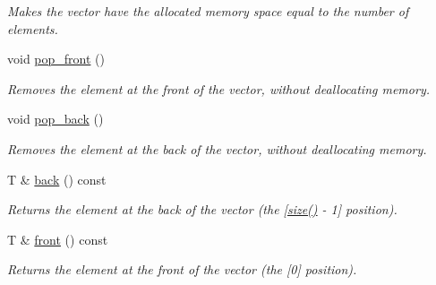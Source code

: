 \begin{DoxyCompactItemize}
\begin{DoxyCompactList}\small\item\em Makes the vector have the allocated memory space equal to the number of elements. \end{DoxyCompactList}\item 
\mbox{\label{classsc_1_1Vector_a51b1b215ab5bfb9b6fdfc7104838efec}} 
void \hyperlink{classsc_1_1Vector_a51b1b215ab5bfb9b6fdfc7104838efec}{pop\+\_\+front} ()
\begin{DoxyCompactList}\small\item\em Removes the element at the front of the vector, without deallocating memory. \end{DoxyCompactList}\item 
\mbox{\label{classsc_1_1Vector_ab95364b7ec9fe400a6f9aeb00ce52487}} 
void \hyperlink{classsc_1_1Vector_ab95364b7ec9fe400a6f9aeb00ce52487}{pop\+\_\+back} ()
\begin{DoxyCompactList}\small\item\em Removes the element at the back of the vector, without deallocating memory. \end{DoxyCompactList}\item 
\mbox{\label{classsc_1_1Vector_a5f22f07525e27b2233d590fbc2f3fe1f}} 
T \& \hyperlink{classsc_1_1Vector_a5f22f07525e27b2233d590fbc2f3fe1f}{back} () const
\begin{DoxyCompactList}\small\item\em Returns the element at the back of the vector (the \mbox{[}\hyperlink{classsc_1_1Vector_a2ccab0421fad94601e6bd5e344aa3340}{size()} -\/ 1\mbox{]} position). \end{DoxyCompactList}\item 
\mbox{\label{classsc_1_1Vector_a454309a6f216423c08fd24e7e1004849}} 
T \& \hyperlink{classsc_1_1Vector_a454309a6f216423c08fd24e7e1004849}{front} () const
\begin{DoxyCompactList}\small\item\em Returns the element at the front of the vector (the \mbox{[}0\mbox{]} position). \end{DoxyCompactList}\item 
\mbox{\label{classsc_1_1Vector_a312f07c5f7a6fdf16c2f88d24ed2a95f}} 

\end{DoxyCompactItemize}

